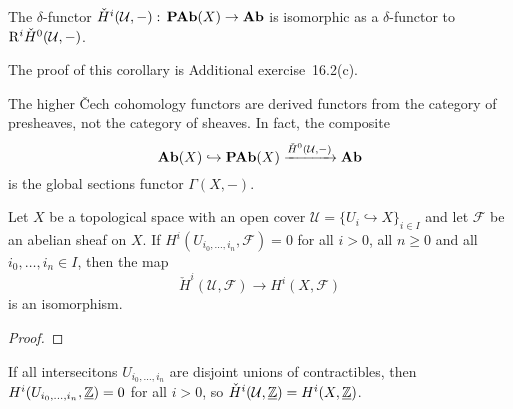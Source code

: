 \begin{cor}
The \(\delta\)-functor \(\check{H}^i(\mathcal U,-)\colon\catAbelianPresheaf(X)\to\catAbelianGroup\) is isomorphic as a \(\delta\)-functor to \(\mathrm{R}^i\check{H}^0(\mathcal U,-)\).
\end{cor}
The proof of this corollary is Additional exercise~16.2(c).

\begin{rmk}
The higher Čech cohomology functors are derived functors from the category of presheaves, not the category of sheaves.
In fact, the composite
\[ \operatorname{\mathbf{Ab}}(X)\hookrightarrow\operatorname{\mathbf{PAb}}(X)\xrightarrow{\check{H}^0(\mathcal U,-)}\mathbf{Ab} \]
is the global sections functor \(\Gamma(X,-)\).
\end{rmk}


\begin{cor}
Let \(X\) be a topological space with an open cover \(\mathcal U=\{U_i\hookrightarrow X\}_{i\in I}\) and let \(\mathcal F\) be an abelian sheaf on \(X\).
If \(H^i(U_{i_0,\ldots,i_n},\mathcal F)=0\) for all \(i>0\), all \(n\geq 0\) and all \(i_0,\ldots,i_n\in I\), then the map
\[ \check{H}^i(\mathcal U,\mathcal F) \to H^i(X,\mathcal F) \]
is an isomorphism.
\end{cor}
\begin{proof}
\end{proof}

\begin{exmp}
If all intersecitons \(U_{i_0,\ldots,i_n}\) are disjoint unions of contractibles, then \(H^i(U_{i_0,\ldots,i_n},\underline{\mathbb{Z}})=0\) for all \(i>0\), so \(\check{H}^i(\mathcal U,\underline{\mathbb{Z}})=H^i(X,\underline{\mathbb{Z}})\).
\end{exmp}

